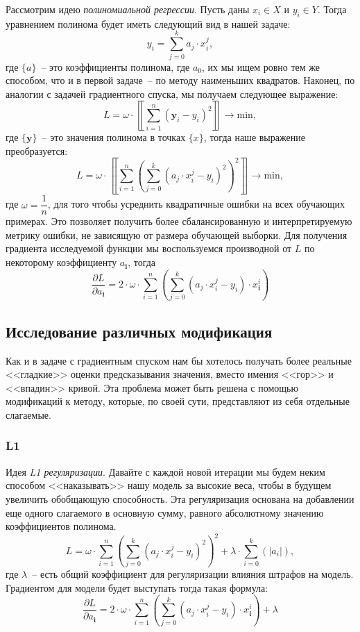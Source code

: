 \documentclass[12pt, a4paper, oneside, final]{article}
\begin{document}
	Рассмотрим идею \textit{полиномиальной регрессии}.
	Пусть даны $x_{i} \in X$ и $y_{i} \in Y$.
	Тогда уравнением полинома будет иметь следующий вид в нашей задаче:
	\[
		y_{i} = \sum\limits_{j = 0}^{k}{a_{j} \cdot x_{i}^{j}},
	\]
	где $\{a\}$~-- это коэффициенты полинома, где $a_{0}$, их мы ищем ровно тем же способом, что и в первой задаче~-- по методу наименьших квадратов.
	Наконец, по аналогии с задачей градиентного спуска, мы получаем следующее выражение:
	\[
		L = \omega \cdot \left\llbracket\sum\limits_{i = 1}^{n}{\left(\mathbf{y}_{i} - y_{i}\right)^{2}}\right\rrbracket \to \mathrm{min},
	\]
	где $\{\mathbf{y}\}$~-- это значения полинома в точках $\{x\}$, тогда наше выражение преобразуется:
	\[
		L = \omega \cdot \left\llbracket\sum\limits_{i = 1}^{n}{\left(\sum\limits_{j = 0}^{k}{\left(a_{j} \cdot x_{i}^{j} - y_{i}\right)^{2}}\right)^{2}}\right\rrbracket \to \mathrm{min},
	\]
	где $\omega = \dfrac{1}{n}$, для того чтобы усреднить квадратичные ошибки на всех обучающих примерах.
	Это позволяет получить более сбалансированную и интерпретируемую метрику ошибки, не зависящую от размера обучающей выборки.
	Для получения градиента исследуемой функции мы воспользуемся производной от $L$ по некоторому коэффициенту $a_{\mathbf{i}}$, тогда
	\[
		\dfrac{\partial{L}}{\partial{a_{\mathbf{i}}}} = 2 \cdot \omega \cdot \sum\limits_{i = 1}^{n}{\left(\sum\limits_{j = 0}^{k}{\left(a_{j} \cdot x_{i}^{j} - y_{i}\right) \cdot x^{i}_{\mathbf{i}}}\right)}
	\]
	\subsection*{Исследование различных модификация}
	Как и в задаче с градиентным спуском нам бы хотелось получать более реальные <<гладкие>> оценки предсказывания значения, вместо имения <<гор>> и <<впадин>> кривой.
	Эта проблема может быть решена с помощью модификаций к методу, которые, по своей сути, представляют из себя отдельные слагаемые.
	\subsubsection*{L1}
	Идея \textit{L1 регуляризации}.
	Давайте с каждой новой итерации мы будем неким способом <<наказывать>> нашу модель за высокие веса, чтобы в будущем увеличить обобщающую способность.
	Эта регуляризация основана на добавлении еще одного слагаемого в основную сумму, равного абсолютному значению коэффициентов полинома.
	\[
		L = \omega \cdot \sum\limits_{i = 1}^{n}{\left(\sum\limits_{j = 0}^{k}{\left(a_{j} \cdot x_{i}^{j} - y_{i}\right)^{2}}\right)^{2}} + \lambda \cdot \sum\limits_{i = 0}^{k}{\left(|a_{i}|\right)},
	\]
	где $\lambda$~-- есть общий коэффициент для регуляризации влияния штрафов на модель.
	Градиентом для модели будет выступать тогда такая формула:
	\[
		\dfrac{\partial{L}}{\partial{a_{\mathbf{i}}}} = 2 \cdot \omega \cdot \sum\limits_{i = 1}^{n}{\left(\sum\limits_{j = 0}^{k}{\left(a_{j} \cdot x_{i}^{j} - y_{i}\right) \cdot x^{i}_{\mathbf{i}}}\right)} + \lambda
	\]
\end{document}
